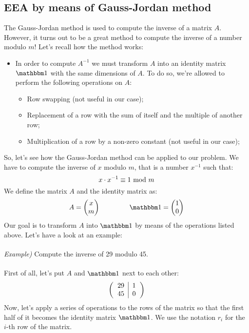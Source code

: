 \subsection{EEA by means of Gauss-Jordan method}
The Gauss-Jordan method is used to compute the inverse of a matrix $A$. However, it turns out to be a great method to compute the inverse of a number modulo $m$! Let's recall how the method works:
\begin{itemize}
    \item In order to compute $A^{-1}$ we must transform $A$ into an identity matrix $\idMatrix$ with the same dimensions of $A$. To do so, we're allowed to perform the following operations on $A$:
    \begin{itemize}
        \item Row swapping (not useful in our case);
        \item Replacement of a row with the sum of itself and the multiple of another row;
        \item Multiplication of a row by a non-zero constant (not useful in our case);
    \end{itemize}
\end{itemize}
So, let's see how the Gauss-Jordan method can be applied to our problem. We have to compute the inverse of $x$ modulo $m$, that is a number $x^{-1}$ such that:
$$x\cdot x^{-1}\equiv1\text{ mod } m$$
We define the matrix $A$ and the identity matrix as:
$$
    A=\begin{pmatrix}
        x\\
        m
    \end{pmatrix}\hspace{1.5cm}
    \idMatrix=\begin{pmatrix}
        1\\
        0
    \end{pmatrix}
$$
Our goal is to transform $A$ into $\idMatrix$ by means of the operations listed above. Let's have a look at an example:\\\\
\textit{Example)} Compute the inverse of 29 modulo 45.\\\\
First of all, let's put $A$ and $\idMatrix$ next to each other:
$$\left(\begin{tabular}{c|c}
    29&1\\
    45&0
\end{tabular}\right)$$
Now, let's apply a series of operations to the rows of the matrix so that the first half of it becomes the identity matrix $\idMatrix$. We use the notation $r_i$ for the $i$-th row of the matrix.
